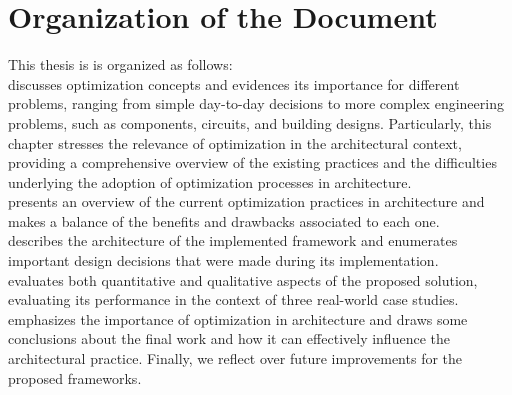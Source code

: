 \section{Organization of the Document}
This thesis is is organized as follows: \\ 
\textbf{} discusses optimization concepts and evidences its importance for different problems, ranging from simple day-to-day decisions to more complex engineering problems, such as components, circuits, and building designs. Particularly, this chapter stresses the relevance of optimization in the architectural context, providing a comprehensive overview of the existing practices and the difficulties underlying the adoption of optimization processes in architecture. \\
\textbf{} presents an overview of the current optimization practices in architecture and makes a balance of the benefits and drawbacks associated to each one.  \\
\textbf{} describes the architecture of the implemented framework and enumerates important design decisions that were made during its implementation. \\
\textbf{} evaluates both quantitative and qualitative aspects of the proposed solution, evaluating its performance in the context of three real-world case studies. \\
\textbf{} emphasizes the importance of optimization in architecture and draws some conclusions about the final work and how it can effectively influence the architectural practice. Finally, we reflect over future improvements for the proposed frameworks. \\
